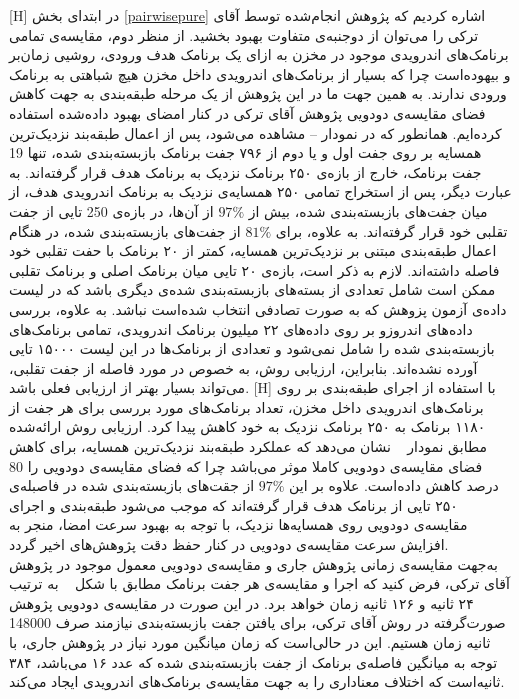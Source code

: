     [H]
 \vspace{1em}
 در ابتدای بخش 
 \ref{pairwisepure}
 اشاره‌ کردیم که پژوهش انجام‌شده توسط آقای ترکی را می‌توان از دوجنبه‌ی متفاوت بهبود بخشید. از منظر دوم، مقایسه‌ی تمامی برنامک‌های اندرویدی موجود در مخزن به ازای یک برنامک هدف ورودی، روشیی زمان‌بر و بیهوده‌است چرا که بسیار از برنامک‌های اندرویدی داخل مخزن هیچ‌ شباهتی به برنامک ورودی ندارند. به همین جهت ما در این پژوهش از یک مرحله‌ طبقه‌بندی به جهت کاهش فضای مقایسه‌ی دودویی پژوهش آقای ترکی در کنار امضای بهبود داده‌شده استفاده کرده‌ایم. همانطور که در نمودار -- مشاهده می‌شود، پس از اعمال طبقه‌بند نزدیک‌ترین همسایه بر روی جفت اول و یا دوم از ۷۹۶ جفت برنامک بازبسته‌بندی شده، تنها 19 جفت برنامک، خارج از بازه‌ی ۲۵۰ برنامک نزدیک به برنامک هدف قرار گرفته‌اند. به عبارت دیگر، پس از استخراج تمامی ۲۵۰ همسایه‌ی نزدیک به برنامک اندرویدی هدف، از میان جفت‌های بازبسته‌بندی شده، بیش از $97\%$ از آن‌ها،  در بازه‌ی 250 تایی از جفت تقلبی خود قرار گرفته‌اند. به علاوه، برای  $81\%$ از جفت‌های بازبسته‌بندی شده، در هنگام اعمال طبقه‌بندی مبتنی بر نزدیک‌ترین همسایه، کمتر از ۲۰ برنامک با حفت تقلبی خود فاصله داشته‌اند. لازم به ذکر است، بازه‌ی ۲۰ تایی میان برنامک اصلی و برنامک تقلبی ممکن است شامل تعدادی از بسته‌های بازبسته‌بندی شده‌ی دیگری باشد که در لیست داده‌ی آزمون پزوهش که به صورت تصادفی انتخاب شده‌است نباشد. به علاوه، بررسی داده‌های اندروزو بر روی داده‌‌های ۲۲ میلیون برنامک اندرویدی، تمامی برنامک‌های بازبسته‌بندی شده را شامل نمی‌شود و تعدادی از برنامک‌ها در این لیست ۱۵۰۰۰ تایی آورده نشده‌اند. بنابراین، ارزیابی روش، به خصوص در مورد فاصله از جفت تقلبی، می‌تواند بسیار بهتر از ارزیابی فعلی باشد. 
     [H]
 \vspace{1em}
با استفاده از اجرای طبقه‌بندی بر روی برنامک‌های اندرویدی داخل مخزن، تعداد برنامک‌های مورد بررسی برای هر جفت از ۱۱۸۰ برنامک به ۲۵۰ برنامک نزدیک به خود کاهش پیدا کرد. ارزیابی روش ارائه‌شده مطابق نمودار ~ نشان می‌دهد که عملکرد طبقه‌بند نزدیک‌ترین همسایه، برای کاهش فضای مقایسه‌ی دودویی کاملا موثر می‌باشد چرا که فضای مقایسه‌ی دودویی را 80 درصد کاهش داده‌است. علاوه‌ بر این $97\%$ از جقت‌های بازبسته‌بندی شده در فاصبله‌ی ۲۵۰ تایی از برنامک هدف قرار گرفته‌اند که موجب می‌شود طبقه‌بندی و اجرای مقایسه‌ی دودویی روی همسایه‌ها نزدیک، با توجه به بهبود سرعت امضا، منجر به افزایش سرعت مقایسه‌ی دودویی در کنار حفظ دقت پژوهش‌های اخیر گردد. \\
به‌جهت مقایسه‌ی زمانی پژوهش جاری و مقایسه‌ی دودویی معمول موجود در پژوهش آقای ترکی، فرض کنید که اجرا و مقایسه‌ی هر جفت برنامک مطابق با شکل ~  به ترتیب ۲۴ ثانیه و ۱۲۶ ثانیه زمان خواهد برد. در این صورت در مقایسه‌ی دودویی پژوهش صورت‌گرفته در روش آقای ترکی، برای یافتن جفت بازبسته‌بندی نیازمند صرف 148000 ثانیه زمان هستیم. این در حالی‌است که زمان میانگین مورد نیاز در پژوهش جاری، با توجه به میانگین فاصله‌ی برنامک از جفت بازبسته‌بندی شده که عدد ۱۶ می‌باشد، ۳۸۴ ثانیه‌است که اختلاف معناداری را به جهت مقایسه‌ی برنامک‌های اندرویدی ایجاد می‌کند. 
